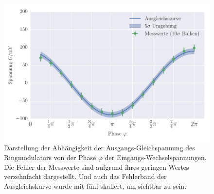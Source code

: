 
\FloatBarrier\begin{figure}[!h]
\centering
\includegraphics[scale=1]{../Grafiken/Phasenempfindlicher_Gleichrichter.pdf}
\caption{Darstellung der Abhängigkeit der Ausgangs-Gleichspannung des 
	Ringmodulators von der Phase $\varphi$ der Eingangs-Wechselspannungen. 
	Die Fehler der Messwerte sind aufgrund ihres geringen Wertes verzehnfacht
	dargestellt. Und auch das Fehlerband der Ausgleichskurve wurde mit fünf skaliert,
	um sichtbar zu sein.
	\label{fig:phasenempfindlicher_gleichrichter}}
\end{figure}
\FloatBarrier